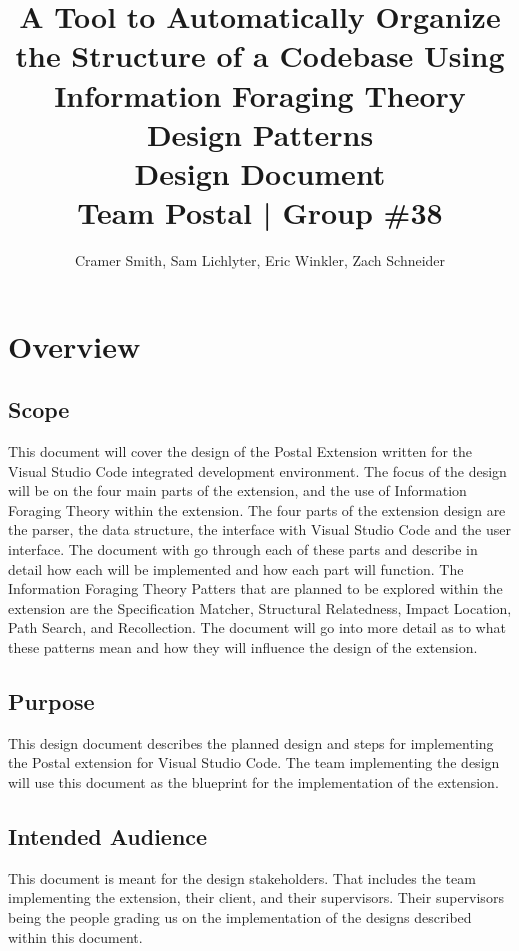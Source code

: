 \documentclass[letterpaper,10pt,titlepage,draftclsnofoot,onecolumn,onesided] {IEEEtran}
\def\doctitle{A Tool to Automatically Organize the Structure of a Codebase Using Information Foraging Theory Design Patterns}
\def\doctype{Design Document}
\def\team{Team Postal | Group \#38}
\begin{document}
\title{\Huge{\bfseries{\textsf{\doctitle}}}\\\textsf{\Large{\doctype}}\\\textsf{\large{\team}}}
\author{Cramer Smith, Sam Lichlyter, Eric Winkler, Zach Schneider}

\maketitle
\vfill
\vfill

\pagebreak

\tableofcontents

\pagebreak

\section{Overview}

\subsection{Scope}
This document will cover the design of the Postal Extension written for the Visual Studio Code integrated development environment. 
The focus of the design will be on the four main parts of the extension, and the use of Information Foraging Theory within the extension.
The four parts of the extension design are the parser, the data structure, the interface with Visual Studio Code and the user interface.
The document with go through each of these parts and describe in detail how each will be implemented and how each part will function.
The Information Foraging Theory Patters that are planned to be explored within the extension are the Specification Matcher, Structural Relatedness, Impact Location, Path Search, and Recollection.
The document will go into more detail as to what these patterns mean and how they will influence the design of the extension.

\subsection{Purpose}
This design document describes the planned design and steps for implementing the Postal extension for Visual Studio Code. 
The team implementing the design will use this document as the blueprint for the implementation of the extension. 

\subsection{Intended Audience}
This document is meant for the design stakeholders. 
That includes the team implementing the extension, their client, and their supervisors. 
Their supervisors being the people grading us on the implementation of the designs described within this document.
\end{document}
